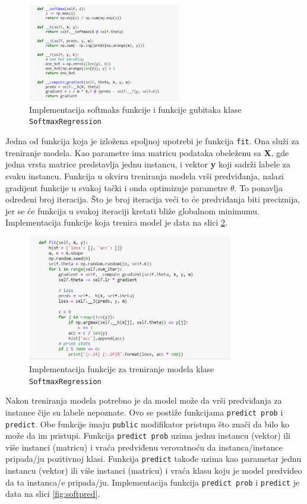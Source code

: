 \documentclass[a4paper,12pt]{report}
\begin{document}
\begin{figure}[h]
    \centering
    \includegraphics[width=0.6\textwidth]{softmax_predict.png}
    \caption{Implementacija softmaks funkcije i funkcije gubitaka klase \texttt{SoftmaxRegression}}\label{fig:softmaxpred}
\end{figure}

Jedna od funkcija koja je izložena spoljnoj upotrebi je funkcija \texttt{fit}. Ona služi za treniranje modela. Kao parametre ima matricu podataka obeleženu sa \textbf{X}, gde jedna vrsta matrice predstavlja jednu instancu, i vektor \textbf{y} koji sadrži labele za svaku instancu. Funkcija u okviru treniranja modela vrši predviđanja, nalazi gradijent funkcije u svakoj tački i onda optimizuje parametre $\theta$. To ponavlja određeni broj iteracija. Što je broj iteracija veći to će predviđanja biti preciznija, jer se će funkcija u svakoj iteraciji kretati bliže globalnom minimumu. Implementacija funkcije koja trenira model je data na slici \ref{fig:softfit}.

\begin{figure}[h]
    \centering
    \includegraphics[width=0.8\textwidth]{softfit.png}
    \caption{Implementacija funkcije za treniranje modela klase \texttt{SoftmaxRegression}}\label{fig:softfit}
\end{figure}

Nakon treniranja modela potrebno je da model može da vrši predviđanja za instance čije su labele nepoznate. Ovo se postiže funkcijama \texttt{predict prob} i \texttt{predict}. Obe funkcije imaju \texttt{public} modifikator pristupa što znači da bilo ko može da im pristupi. Funkcija \texttt{predict prob} uzima jednu instancu (vektor) ili više instanci (matricu)  i vraća predviđenu verovatnoću da instanca/instance pripada/ju pozitivnoj klasi. Funkcija \texttt{predict} takođe uzima kao parametar jednu instancu (vektor) ili više instanci (matricu) i vraća klasu koju je model predvideo da ta instanca/e pripada/ju.  Implementacija funkcija \texttt{predict prob} i \texttt{predict} je data na slici \ref{fig:softpred}.
\end{document}
